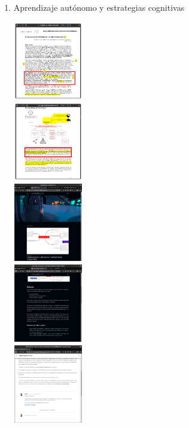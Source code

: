 \documentclass[12pt]{article}
\begin{document}
\begin{enumerate}[{\bf Sesi\'on} 1{.}]
\begin{enumerate}[{\bf Actividad} 1{.}]
				\item {Aprendizaje autónomo y estrategias cognitivas}
					\begin{multicols}{3}			
						\includegraphics[width=0.24\textwidth] {CIVUL-U1-S3-A2-1}\\
						\includegraphics[width=0.24\textwidth] {CIVUL-U1-S3-A2-2}\\
						\includegraphics[width=0.24\textwidth] {CIVUL-U1-S3-A2-3}\\
						\includegraphics[width=0.24\textwidth] {CIVUL-U1-S3-A2-4}\\
						\includegraphics[width=0.24\textwidth] {CIVUL-U1-S3-A2-5}
					\end{multicols}
					

\end{enumerate}
\end{enumerate}
\end{document}
